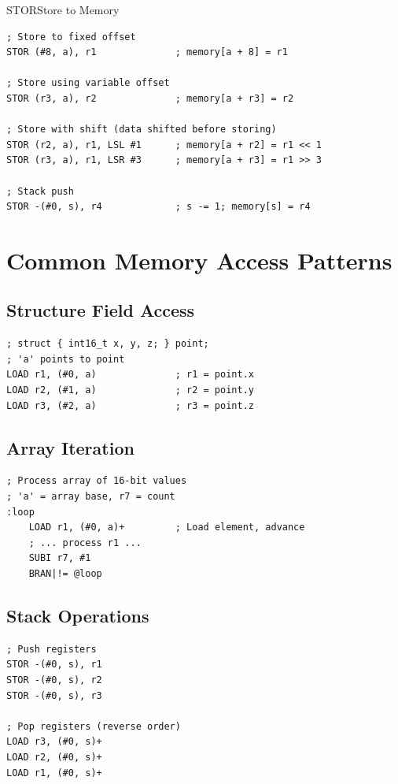 \begin{instructionbox}{STOR}{Store to Memory}
	\begin{example}
		\begin{lstlisting}
; Store to fixed offset
STOR (#8, a), r1              ; memory[a + 8] = r1

; Store using variable offset
STOR (r3, a), r2              ; memory[a + r3] = r2

; Store with shift (data shifted before storing)
STOR (r2, a), r1, LSL #1      ; memory[a + r2] = r1 << 1
STOR (r3, a), r1, LSR #3      ; memory[a + r3] = r1 >> 3

; Stack push
STOR -(#0, s), r4             ; s -= 1; memory[s] = r4
		\end{lstlisting}
		\caption{Indirect, Shifted, and Pre-Decrement Stores}
	\end{example}
\end{instructionbox}

\section{Common Memory Access Patterns}

\subsection{Structure Field Access}
\begin{lstlisting}
; struct { int16_t x, y, z; } point;
; 'a' points to point
LOAD r1, (#0, a)              ; r1 = point.x
LOAD r2, (#1, a)              ; r2 = point.y
LOAD r3, (#2, a)              ; r3 = point.z
\end{lstlisting}

\subsection{Array Iteration}
\begin{lstlisting}
; Process array of 16-bit values
; 'a' = array base, r7 = count
:loop
    LOAD r1, (#0, a)+         ; Load element, advance
    ; ... process r1 ...
    SUBI r7, #1
    BRAN|!= @loop
\end{lstlisting}

\subsection{Stack Operations}
\begin{lstlisting}
; Push registers
STOR -(#0, s), r1
STOR -(#0, s), r2
STOR -(#0, s), r3

; Pop registers (reverse order)
LOAD r3, (#0, s)+
LOAD r2, (#0, s)+
LOAD r1, (#0, s)+
\end{lstlisting}

